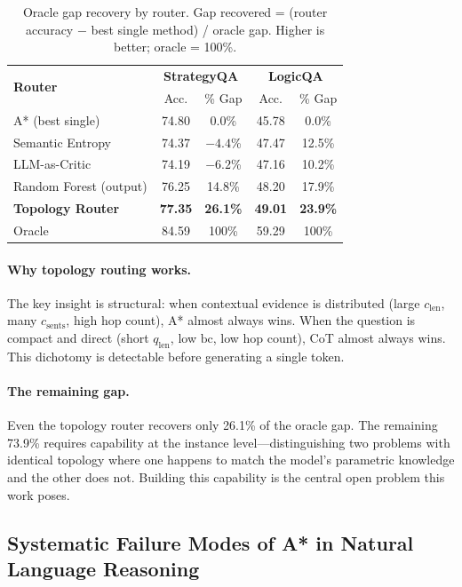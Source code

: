 \documentclass[11pt]{article}
\begin{document}
\begin{table}[t]
\centering
\caption{Oracle gap recovery by router. Gap recovered = (router accuracy $-$ best single method) / oracle gap. Higher is better; oracle = 100\%.}
\label{tab:oracle_recovery}
\small
\begin{tabular}{lcccc}
\toprule
\multirow{2}{*}{\textbf{Router}} & \multicolumn{2}{c}{\textbf{StrategyQA}} & \multicolumn{2}{c}{\textbf{LogicQA}} \\
& Acc. & \% Gap & Acc. & \% Gap \\
\midrule
A* (best single)          & 74.80 & 0.0\%  & 45.78 & 0.0\% \\
Semantic Entropy          & 74.37 & $-4.4$\% & 47.47 & 12.5\% \\
LLM-as-Critic             & 74.19 & $-6.2$\% & 47.16 & 10.2\% \\
Random Forest (output)    & 76.25 & 14.8\% & 48.20 & 17.9\% \\
\textbf{Topology Router}  & \textbf{77.35} & \textbf{26.1\%} & \textbf{49.01} & \textbf{23.9\%} \\
Oracle                    & 84.59 & 100\%  & 59.29 & 100\% \\
\bottomrule
\end{tabular}
\end{table}

\paragraph{Why topology routing works.}
The key insight is structural: when contextual evidence is distributed (large $c_{\mathrm{len}}$, many $c_{\mathrm{sents}}$, high hop count), A* almost always wins. When the question is compact and direct (short $q_{\mathrm{len}}$, low $\mathrm{bc}$, low hop count), CoT almost always wins. This dichotomy is detectable before generating a single token.

\paragraph{The remaining gap.}
Even the topology router recovers only 26.1\% of the oracle gap. The remaining 73.9\% requires capability at the instance level—distinguishing two problems with identical topology where one happens to match the model's parametric knowledge and the other does not. Building this capability is the central open problem this work poses.

\subsection{Systematic Failure Modes of A* in Natural Language Reasoning}
\label{sec:failuremodes}
\end{document}
